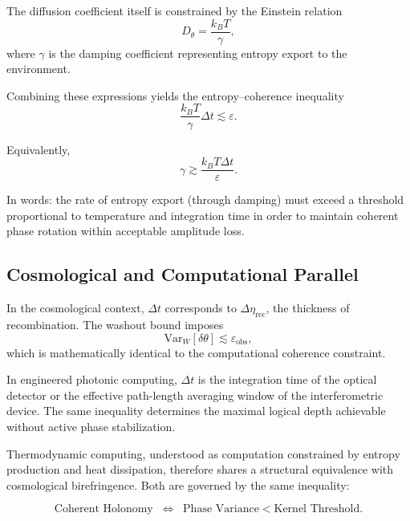 \documentclass[12pt]{article}
\begin{document}
The diffusion coefficient itself is constrained by the Einstein relation
\begin{equation}
D_\theta
=
\frac{k_B T}{\gamma},
\end{equation}
where $\gamma$ is the damping coefficient representing entropy export to the environment.

Combining these expressions yields the entropy--coherence inequality
\begin{equation}
\frac{k_B T}{\gamma}
\Delta t
\lesssim
\varepsilon.
\end{equation}

Equivalently,
\begin{equation}
\gamma
\gtrsim
\frac{k_B T \Delta t}{\varepsilon}.
\end{equation}

In words: the rate of entropy export (through damping) must exceed a threshold proportional to temperature and integration time in order to maintain coherent phase rotation within acceptable amplitude loss.

\subsection*{Cosmological and Computational Parallel}

In the cosmological context, $\Delta t$ corresponds to $\Delta\eta_{\mathrm{rec}}$, the thickness of recombination. The washout bound imposes
\begin{equation}
\mathrm{Var}_W[\delta\theta]
\lesssim
\varepsilon_{\mathrm{obs}},
\end{equation}
which is mathematically identical to the computational coherence constraint.

In engineered photonic computing, $\Delta t$ is the integration time of the optical detector or the effective path-length averaging window of the interferometric device. The same inequality determines the maximal logical depth achievable without active phase stabilization.

Thermodynamic computing, understood as computation constrained by entropy production and heat dissipation, therefore shares a structural equivalence with cosmological birefringence. Both are governed by the same inequality:

\begin{equation}
\text{Coherent Holonomy}
\;\;\Longleftrightarrow\;\;
\text{Phase Variance}
<
\text{Kernel Threshold}.
\end{equation}
\end{document}
